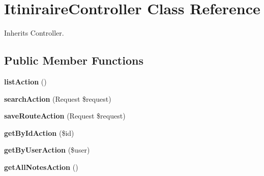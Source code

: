 \hypertarget{class_site_1_1_trail_bundle_1_1_controller_1_1_itiniraire_controller}{}\section{Itiniraire\+Controller Class Reference}
\label{class_site_1_1_trail_bundle_1_1_controller_1_1_itiniraire_controller}


Inherits Controller.

\subsection*{Public Member Functions}
\begin{DoxyCompactItemize}
\item 
\hypertarget{class_site_1_1_trail_bundle_1_1_controller_1_1_itiniraire_controller_a6eda2bd1ea1df0b02479c67431c50ddb}{}{\bfseries list\+Action} ()\label{class_site_1_1_trail_bundle_1_1_controller_1_1_itiniraire_controller_a6eda2bd1ea1df0b02479c67431c50ddb}

\item 
\hypertarget{class_site_1_1_trail_bundle_1_1_controller_1_1_itiniraire_controller_a5b3f342d493c408cd33293e02e5eee7b}{}{\bfseries search\+Action} (Request \$request)\label{class_site_1_1_trail_bundle_1_1_controller_1_1_itiniraire_controller_a5b3f342d493c408cd33293e02e5eee7b}

\item 
\hypertarget{class_site_1_1_trail_bundle_1_1_controller_1_1_itiniraire_controller_a127f81b6654f0298a34152a32a276713}{}{\bfseries save\+Route\+Action} (Request \$request)\label{class_site_1_1_trail_bundle_1_1_controller_1_1_itiniraire_controller_a127f81b6654f0298a34152a32a276713}

\item 
\hypertarget{class_site_1_1_trail_bundle_1_1_controller_1_1_itiniraire_controller_abe0c9424c5042b53734404b87c66b4d0}{}{\bfseries get\+By\+Id\+Action} (\$id)\label{class_site_1_1_trail_bundle_1_1_controller_1_1_itiniraire_controller_abe0c9424c5042b53734404b87c66b4d0}

\item 
\hypertarget{class_site_1_1_trail_bundle_1_1_controller_1_1_itiniraire_controller_a6d308146e1e09a81dd9a8bd4f3060551}{}{\bfseries get\+By\+User\+Action} (\$user)\label{class_site_1_1_trail_bundle_1_1_controller_1_1_itiniraire_controller_a6d308146e1e09a81dd9a8bd4f3060551}

\item 
\hypertarget{class_site_1_1_trail_bundle_1_1_controller_1_1_itiniraire_controller_ac7574dfde1b4367c5edfae24cc8cab2d}{}{\bfseries get\+All\+Notes\+Action} ()\label{class_site_1_1_trail_bundle_1_1_controller_1_1_itiniraire_controller_ac7574dfde1b4367c5edfae24cc8cab2d}


\end{DoxyCompactItemize}
